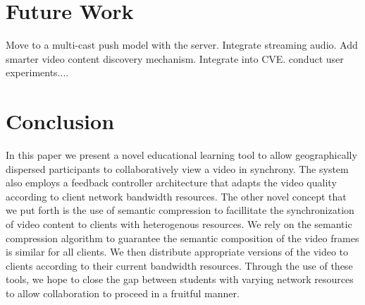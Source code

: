 \documentclass{sig-alternate}
\begin{document}
%

\section{Future Work} \label{con}
Move to a multi-cast push model with the server.  Integrate streaming
audio.  Add smarter video content discovery mechanism.  Integrate into
CVE.  conduct user experiments....


\section{Conclusion}

In this paper we present a novel educational learning tool to allow
geographically dispersed participants to collaboratively view a video
in synchrony.  The system also employs a feedback controller
architecture that adapts the video quality according to client network
bandwidth resources.  The other novel concept that we put forth is the
use of semantic compression to facillitate the synchronization of
video content to clients with heterogenous resources.  We rely on the
semantic compression algorithm to guarantee the semantic composition
of the video frames is similar for all clients.  We then distribute
appropriate versions of the video to clients according to their
current bandwidth resources.  Through the use of these tools, we hope
to close the gap between students with varying network resources to
allow collaboration to proceed in a fruitful manner.

\end{document}
